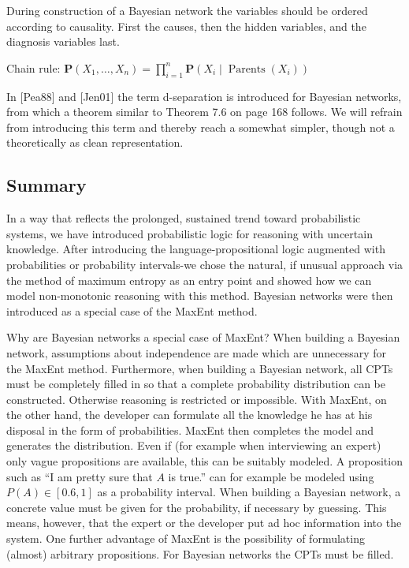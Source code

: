 \documentclass[10pt]{book}
\begin{document}
During construction of a Bayesian network the variables should be ordered according to causality. First the causes, then the hidden variables, and the diagnosis variables last.

Chain rule: $\boldsymbol{P}\left(X_{1}, \ldots, X_{n}\right)=\prod_{i=1}^{n} \boldsymbol{P}\left(X_{i} \mid \operatorname{Parents}\left(X_{i}\right)\right)$

In [Pea88] and [Jen01] the term d-separation is introduced for Bayesian networks, from which a theorem similar to Theorem 7.6 on page 168 follows. We will refrain from introducing this term and thereby reach a somewhat simpler, though not a theoretically as clean representation.

\subsection{Summary}
In a way that reflects the prolonged, sustained trend toward probabilistic systems, we have introduced probabilistic logic for reasoning with uncertain knowledge. After introducing the language-propositional logic augmented with probabilities or probability intervals-we chose the natural, if unusual approach via the method of maximum entropy as an entry point and showed how we can model non-monotonic reasoning with this method. Bayesian networks were then introduced as a special case of the MaxEnt method.

Why are Bayesian networks a special case of MaxEnt? When building a Bayesian network, assumptions about independence are made which are unnecessary for the MaxEnt method. Furthermore, when building a Bayesian network, all CPTs must be completely filled in so that a complete probability distribution can be constructed. Otherwise reasoning is restricted or impossible. With MaxEnt, on the other hand, the developer can formulate all the knowledge he has at his disposal in the form of probabilities. MaxEnt then completes the model and generates the distribution. Even if (for example when interviewing an expert) only vague propositions are available, this can be suitably modeled. A proposition such as ``I am pretty sure that $A$ is true.'' can for example be modeled using $P(A) \in[0.6,1]$ as a probability interval. When building a Bayesian network, a concrete value must be given for the probability, if necessary by guessing. This means, however, that the expert or the developer put ad hoc information into the system. One further advantage of MaxEnt is the possibility of formulating (almost) arbitrary propositions. For Bayesian networks the CPTs must be filled.
\end{document}
